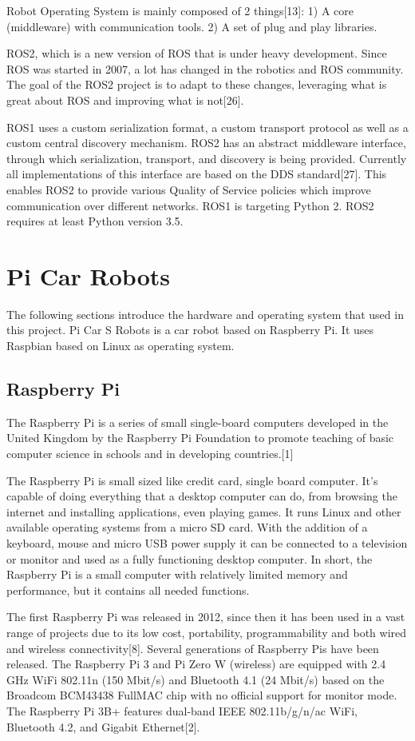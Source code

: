 \documentclass{mproj}
\begin{document}
Robot Operating System is mainly composed of 2 things[13]:
1) A core (middleware) with communication tools.
2) A set of plug and play libraries.

ROS2, which is a new version of ROS that is under heavy development. Since ROS was started in 2007, a lot has changed in the robotics and ROS community. The goal of the ROS2 project is to adapt to these changes, leveraging what is great about ROS and improving what is not[26]. 

ROS1 uses a custom serialization format, a custom transport protocol as well as a custom central discovery mechanism. ROS2 has an abstract middleware interface, through which serialization, transport, and discovery is being provided. Currently all implementations of this interface are based on the DDS standard[27]. This enables ROS2 to provide various Quality of Service policies which improve communication over different networks. ROS1 is targeting Python 2. ROS2 requires at least Python version 3.5.


\section{Pi Car Robots}
The following sections introduce the hardware and operating system that used in this project. Pi Car S Robots is a car robot based on Raspberry Pi. It uses Raspbian based on Linux as operating system. 

\subsection{Raspberry Pi}
The Raspberry Pi is a series of small single-board computers developed in the United Kingdom by the Raspberry Pi Foundation to promote teaching of basic computer science in schools and in developing countries.[1]

The Raspberry Pi is small sized like credit card, single board computer. It’s capable of doing everything that a desktop computer can do, from browsing the internet and installing applications, even playing games. It runs Linux and other available operating systems from a micro SD card. With the addition of a keyboard, mouse and micro USB power supply it can be connected to a television or monitor and used as a fully functioning desktop computer. In short, the Raspberry Pi is a small computer with relatively limited memory and performance, but it contains all needed functions.

The first Raspberry Pi was released in 2012, since then it has been used in a vast range of projects due to its low cost, portability, programmability and both wired and wireless connectivity[8]. Several generations of Raspberry Pis have been released. The Raspberry Pi 3 and Pi Zero W (wireless) are equipped with 2.4 GHz WiFi 802.11n (150 Mbit/s) and Bluetooth 4.1 (24 Mbit/s) based on the Broadcom BCM43438 FullMAC chip with no official support for monitor mode. The Raspberry Pi 3B+ features dual-band IEEE 802.11b/g/n/ac WiFi, Bluetooth 4.2, and Gigabit Ethernet[2].
\end{document}
